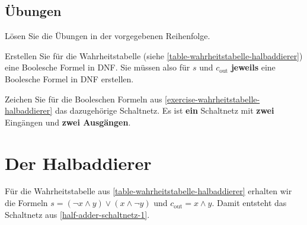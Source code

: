 \subsection{Übungen}

Lösen Sie die Übungen in der vorgegebenen Reihenfolge.

\begin{exercise}
\label{exercise-wahrheitstabelle-halbaddierer}
Erstellen Sie für die Wahrheitstabelle  (siehe \autoref{table-wahrheitstabelle-halbaddierer}) eine Boolesche Formel in \ac{DNF}. Sie müssen also für $s$ und $c_{\text{out}}$ \textbf{jeweils} eine Boolesche Formel in \ac{DNF} erstellen.

\fillwithgrid{2in}
\end{exercise}

\begin{exercise}
Zeichen Sie für die Booleschen Formeln aus \autoref{exercise-wahrheitstabelle-halbaddierer} das dazugehörige Schaltnetz. Es ist \textbf{ein} Schaltnetz mit \textbf{zwei} Eingängen und \textbf{zwei Ausgängen}.


\end{exercise}

\newpage

\section{Der Halbaddierer}

Für die Wahrheitstabelle aus \autoref{table-wahrheitstabelle-halbaddierer} erhalten wir die Formeln $s = (\neg x \wedge y) \vee (x \wedge \neg y)$ und $c_{\text{out}} = x \wedge y$. Damit entsteht das Schaltnetz aus \autoref{half-adder-schaltnetz-1}.

